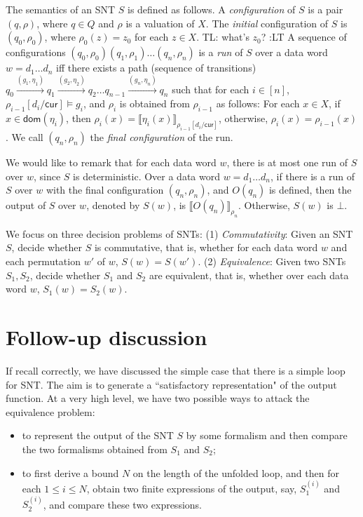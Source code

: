 \documentclass[runningheads,a4paper]{llncs}
\newcommand{\eval}[2]{\llbracket#1\rrbracket_{#2}}
\newcommand\cur{\mathsf{cur}}
\newcommand\dom{\mathsf{dom}}
\newcommand{\tl}[1]{\color{green} {TL: #1 :LT} \color{black}}
\begin{document}
The semantics of an SNT $S$  is defined as follows. A \emph{configuration} of $S$ is a pair $(q,\rho)$, where $q \in Q$ and $\rho$ is a valuation of $X$. The \emph{initial} configuration of $S$ is $(q_0,\rho_0)$, where $\rho_0(z)=z_0$ for each $z \in X$. \tl{what's $z_0$?}
A sequence of configurations $(q_0,\rho_0)(q_1,\rho_1)\ldots(q_n,\rho_n)$ is
a \emph{run} of $S$ over a data word $w=d_1 \dots d_n$ iff there exists a path (sequence of transitions) $q_0 \xrightarrow{(g_1,\eta_1)} q_1 \xrightarrow{(g_2,\eta_2)} q_2 \dots q_{n-1} \xrightarrow{(g_n, \eta_n)} q_n$ such that for each $i \in [n]$, $\rho_{i-1}[d_i/\cur] \models g_i$, and $\rho_i$ is obtained from $\rho_{i-1}$ as follows: For each $x \in X$, if $x \in \dom(\eta_i)$, then $\rho_i(x)=\eval{\eta_i(x)}{\rho_{i-1}[d_i/\cur]}$, otherwise, $\rho_i(x)=\rho_{i-1}(x)$.
We call $(q_n,\rho_n)$ the \emph{final configuration} of the run. %

We would like to remark that for each data word $w$, there is at most one run of $S$ over $w$, since $S$ is deterministic. 
Over a data word $w = d_1 \dots d_n$, if there is a run of $S$ over $w$ with the final configuration $(q_n,\rho_n)$, and $O(q_n)$ is defined, then the output of $S$ over $w$, denoted by ${S}(w)$, is $\eval{O(q_n)}{\rho_n}$. Otherwise, ${S}(w)$ is $\bot$.

We focus on three decision problems of SNTs: (1) \emph{Commutativity}: Given an SNT $S$, decide whether $S$ is commutative, that is, whether for each data word $w$ and each permutation $w'$ of $w$, $S(w)=S(w')$. (2) \emph{Equivalence}: Given two SNTs $S_1,S_2$, decide whether $S_1$ and $S_2$ are equivalent, that is, whether over each data word $w$, $S_1(w)=S_2(w)$.

\section{Follow-up discussion}

If recall correctly, we have discussed the simple case that there is a simple loop for SNT. The aim is to generate a ``satisfactory representation" of the output function. At a very high level, we have two possible ways to attack the equivalence problem:
\begin{itemize}
\item to represent the output of the SNT $S$ by some formalism and then compare the two formalisms obtained from $S_1$ and $S_2$;

\item to first derive a bound $N$ on the length of the unfolded loop, and then for each $1\leq i\leq N$, obtain two finite expressions of the output, say, $S_1^{(i)}$ and $S_2^{(i)}$, and compare these two expressions. 
\end{itemize}
\end{document}
